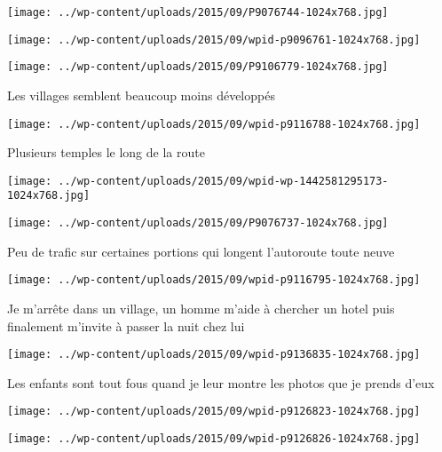  \newline
\centerline{\texttt{[image: ../wp-content/uploads/2015/09/P9076744-1024x768.jpg]} } 
 \newline
 \newline
\centerline{\texttt{[image: ../wp-content/uploads/2015/09/wpid-p9096761-1024x768.jpg]} } 
 \newline
 \newline
\centerline{\texttt{[image: ../wp-content/uploads/2015/09/P9106779-1024x768.jpg]} } 
 \newline
 Les villages semblent beaucoup moins développés \newline
 \newline
\centerline{\texttt{[image: ../wp-content/uploads/2015/09/wpid-p9116788-1024x768.jpg]} } 
 \newline
 Plusieurs temples le long de la route \newline
 \newline
\centerline{\texttt{[image: ../wp-content/uploads/2015/09/wpid-wp-1442581295173-1024x768.jpg]} } 
 \newline
 \newline
\centerline{\texttt{[image: ../wp-content/uploads/2015/09/P9076737-1024x768.jpg]} } 
 \newline
 Peu de trafic sur certaines portions qui longent l'autoroute toute neuve \newline
 \newline
\centerline{\texttt{[image: ../wp-content/uploads/2015/09/wpid-p9116795-1024x768.jpg]} } 
 \newline
 Je m'arrête dans un village, un homme m'aide à chercher un hotel puis finalement m'invite à passer la nuit chez lui \newline
 \newline
\centerline{\texttt{[image: ../wp-content/uploads/2015/09/wpid-p9136835-1024x768.jpg]} } 
 \newline
 Les enfants sont tout fous quand je leur montre les photos que je prends d'eux \newline
 \newline
\centerline{\texttt{[image: ../wp-content/uploads/2015/09/wpid-p9126823-1024x768.jpg]} } 
 \newline
 \newline
\centerline{\texttt{[image: ../wp-content/uploads/2015/09/wpid-p9126826-1024x768.jpg]} } 
